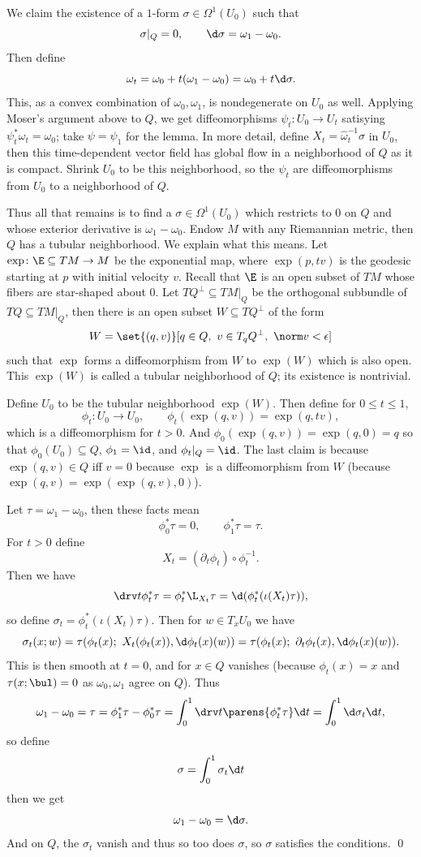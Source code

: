     We claim the existence of a $1$-form $\sigma\in\Omega^1(U_0)$ such that
    $$ \sigma|_Q = 0,\qquad \d\sigma = \omega_1-\omega_0 . $$
    Then define
    $$ \omega_t = \omega_0 + t(\omega_1-\omega_0) = \omega_0 + t\d\sigma . $$
    This, as a convex combination of $\omega_0,\omega_1$, is nondegenerate on $U_0$ as well.
    Applying Moser's argument above to $Q$, we get diffeomorphisms $\psi_t\colon U_0\to U_t$ satisying $\psi_t^*\omega_t=\omega_0$; take $\psi=\psi_1$ for the lemma.
    In more detail, define $X_t=\hat\omega_t^{-1}\sigma$ in $U_0$, then this time-dependent vector field has global flow in a neighborhood of $Q$ as it is compact.
    Shrink $U_0$ to be this neighborhood, so the $\psi_t$ are diffeomorphisms from $U_0$ to a neighborhood of $Q$.

    Thus all that remains is to find a $\sigma\in\Omega^1(U_0)$ which restricts to $0$ on $Q$ and whose exterior derivative is $\omega_1-\omega_0$.
    Endow $M$ with any Riemannian metric, then $Q$ has a tubular neighborhood.
    We explain what this means.
    Let $\exp\colon\E\subseteq TM\to M$ be the exponential map, where $\exp(p,tv)$ is the geodesic starting at $p$ with initial velocity $v$.
    Recall that $\E$ is an open subset of $TM$ whose fibers are star-shaped about $0$.
    Let $TQ^\perp\subseteq TM|_Q$ be the orthogonal subbundle of $TQ\subseteq TM|_Q$, then there is an open subset $W\subseteq TQ^\perp$ of the form
    $$ W = \set{(q,v)}[q\in Q,\ v\in T_qQ^\perp,\ \norm v<\epsilon] $$
    such that $\exp$ forms a diffeomorphism from $W$ to $\exp(W)$ which is also open.
    This $\exp(W)$ is called a {\emphcolor tubular neighborhood} of $Q$; its existence is nontrivial.

    Define $U_0$ to be the tubular neighborhood $\exp(W)$.
    Then define for $0\leq t\leq1$,
    $$ \phi_t\colon U_0\to U_0,\qquad \phi_t(\exp(q,v)) = \exp(q,tv) , $$
    which is a diffeomorphism for $t>0$.
    And $\phi_0(\exp(q,v))=\exp(q,0)=q$ so that $\phi_0(U_0)\subseteq Q$, $\phi_1=\id$, and $\phi_t|_Q=\id$.
    The last claim is because $\exp(q,v)\in Q$ iff $v=0$ because $\exp$ is a diffeomorphism from $W$ (because $\exp(q,v)=\exp(\exp(q,v),0)$).

    Let $\tau=\omega_1-\omega_0$, then these facts mean
    $$ \phi_0^*\tau = 0,\qquad \phi_1^*\tau = \tau . $$
    For $t>0$ define
    $$ X_t = (\partial_t\phi_t)\circ\phi_t^{-1} . $$
    Then we have
    $$ \drv t\phi_t^*\tau = \phi_t^*\L_{X_t}\tau = \d(\phi_t^*(\iota(X_t)\tau)) , $$
    so define $\sigma_t=\phi_t^*(\iota(X_t)\tau)$.
    Then for $w\in T_xU_0$ we have
    $$ \sigma_t(x;w) = \tau(\phi_t(x);\ X_t(\phi_t(x)),\d\phi_t(x)(w)) = \tau(\phi_t(x);\ \partial_t\phi_t(x),\d\phi_t(x)(w)) . $$
    This is then smooth at $t=0$, and for $x\in Q$ vanishes (because $\phi_t(x)=x$ and $\tau(x;\bul)=0$ as $\omega_0,\omega_1$ agree on $Q$).
    Thus
    $$ \omega_1 - \omega_0 = \tau = \phi_1^*\tau - \phi_0^*\tau = \int_0^1\drv t\parens{\phi_t^*\tau}\d t = \int_0^1\d\sigma_t\d t , $$
    so define
    $$ \sigma = \int_0^1\sigma_t\d t $$
    then we get
    $$ \omega_1 - \omega_0 = \d\sigma . $$
    And on $Q$, the $\sigma_t$ vanish and thus so too does $\sigma$, so $\sigma$ satisfies the conditions.
    \qed


